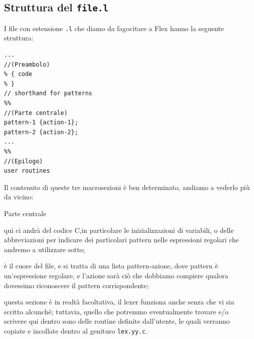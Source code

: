 \documentclass[class=book, crop=false, oneside, 12pt]{standalone}
\begin{document}
\subsection{Struttura del \texttt{file.l}}
I file con estensione \texttt{.l} che diamo da fagocitare a Flex hanno la seguente struttura:
\begin{verbatim}
...
//(Preambolo)
% { code
% }
// shorthand for patterns
%%
//(Parte centrale)
pattern-1 {action-1};
pattern-2 {action-2};
...
%%
//(Epilogo)
user routines
\end{verbatim}
Il contenuto di queste tre macrosezioni è ben determinato, andiamo a vederlo più da vicino:
\begin{labeling}{Parte centrale}
    \item[Preambolo] qui ci andrà del codice C,in particolare le inizializzazioni di variabili, o delle abbreviazioni per indicare dei particolari pattern nelle espressioni regolari che andremo a utilizzare sotto;
    \item[Parte centrale] è il cuore del file, e si tratta di una lista pattern-azione, dove pattern è un'espressione regolare, e l'azione sarà ciò che dobbiamo compiere qualora dovessimo riconoscere il pattern corrispondente;
    \item[Epilogo] questa sezione è in realtà facoltativa, il lexer funziona anche senza che vi sia scritto alcunché; tuttavia, quello che potremmo eventualmente trovare e/o scrivere qui dentro sono delle routine definite dall'utente, le quali verranno copiate e incollate dentro al genituro \texttt{lex.yy.c}.
\end{labeling}
\end{document}
